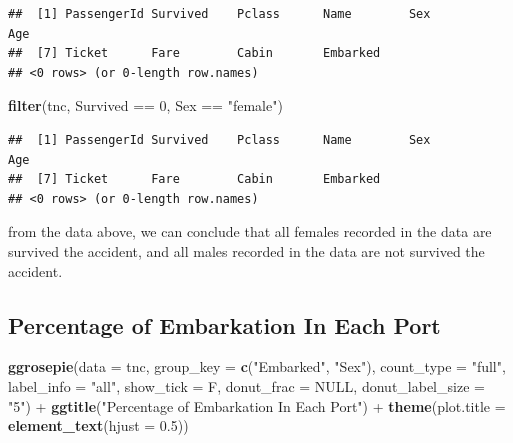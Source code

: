 \documentclass[
]{article}
\newenvironment{Shaded}{\begin{snugshade}}{\end{snugshade}}
\newcommand{\AttributeTok}[1]{\textcolor[rgb]{0.74,0.68,0.62}{#1}}
\newcommand{\ConstantTok}[1]{\textcolor[rgb]{0.74,0.68,0.62}{#1}}
\newcommand{\DecValTok}[1]{\textcolor[rgb]{0.27,0.67,0.26}{#1}}
\newcommand{\FloatTok}[1]{\textcolor[rgb]{0.27,0.67,0.26}{#1}}
\newcommand{\FunctionTok}[1]{\textcolor[rgb]{1.00,0.58,0.35}{\textbf{#1}}}
\newcommand{\NormalTok}[1]{\textcolor[rgb]{0.74,0.68,0.62}{#1}}
\newcommand{\SpecialCharTok}[1]{\textcolor[rgb]{0.02,0.61,0.04}{#1}}
\newcommand{\StringTok}[1]{\textcolor[rgb]{0.02,0.61,0.04}{#1}}
\begin{document}
\begin{verbatim}
##  [1] PassengerId Survived    Pclass      Name        Sex         Age        
##  [7] Ticket      Fare        Cabin       Embarked   
## <0 rows> (or 0-length row.names)
\end{verbatim}

\begin{Shaded}
\begin{Highlighting}[]
\FunctionTok{filter}\NormalTok{(tnc, Survived }\SpecialCharTok{==} \DecValTok{0}\NormalTok{, Sex }\SpecialCharTok{==} \StringTok{"female"}\NormalTok{)}
\end{Highlighting}
\end{Shaded}

\begin{verbatim}
##  [1] PassengerId Survived    Pclass      Name        Sex         Age        
##  [7] Ticket      Fare        Cabin       Embarked   
## <0 rows> (or 0-length row.names)
\end{verbatim}

from the data above, we can conclude that all females recorded in the
data are survived the accident, and all males recorded in the data are
not survived the accident.

\hypertarget{percentage-of-embarkation-in-each-port}{%
\subsection{Percentage of Embarkation In Each
Port}\label{percentage-of-embarkation-in-each-port}}

\begin{Shaded}
\begin{Highlighting}[]
\FunctionTok{ggrosepie}\NormalTok{(}\AttributeTok{data =}\NormalTok{ tnc, }\AttributeTok{group\_key =} \FunctionTok{c}\NormalTok{(}\StringTok{"Embarked"}\NormalTok{, }\StringTok{"Sex"}\NormalTok{), }
          \AttributeTok{count\_type =} \StringTok{"full"}\NormalTok{, }
          \AttributeTok{label\_info =} \StringTok{"all"}\NormalTok{,}
          \AttributeTok{show\_tick =}\NormalTok{ F,}
          \AttributeTok{donut\_frac =} \ConstantTok{NULL}\NormalTok{,}
          \AttributeTok{donut\_label\_size =} \StringTok{"5"}\NormalTok{) }\SpecialCharTok{+} 
  \FunctionTok{ggtitle}\NormalTok{(}\StringTok{"Percentage of Embarkation In Each Port"}\NormalTok{) }\SpecialCharTok{+} 
  \FunctionTok{theme}\NormalTok{(}\AttributeTok{plot.title =} \FunctionTok{element\_text}\NormalTok{(}\AttributeTok{hjust =} \FloatTok{0.5}\NormalTok{))}
\end{Highlighting}
\end{Shaded}
\end{document}
